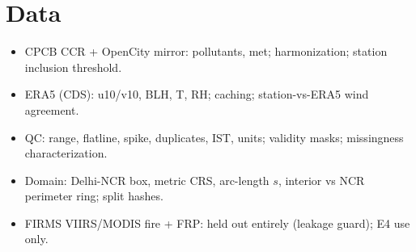 \section{Data}
\begin{itemize}
  \item CPCB CCR + OpenCity mirror: pollutants, met; harmonization; station inclusion threshold.
  \item ERA5 (CDS): u10/v10, BLH, T, RH; caching; station-vs-ERA5 wind agreement.
  \item QC: range, flatline, spike, duplicates, IST, units; validity masks; missingness characterization.
  \item Domain: Delhi-NCR box, metric CRS, arc-length $s$, interior vs NCR perimeter ring; split hashes.
  \item FIRMS VIIRS/MODIS fire + FRP: held out entirely (leakage guard); E4 use only.
\end{itemize}
